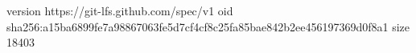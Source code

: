 version https://git-lfs.github.com/spec/v1
oid sha256:a15ba6899fe7a98867063fe5d7cf4cf8c25fa85bae842b2ee456197369d0f8a1
size 18403
